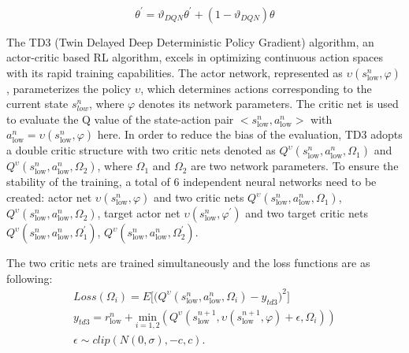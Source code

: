 \documentclass[preprint,12pt]{elsarticle}
\begin{document}
\begin{equation}
\theta^{'}=\vartheta_{DQN}\theta^{'}+(1-\vartheta_{DQN})\theta\label{eq:dqn_para_update}
\end{equation}


The TD3 (Twin Delayed Deep Deterministic Policy Gradient) algorithm, an actor-critic based RL algorithm, excels in optimizing continuous action spaces with its rapid training capabilities. The actor network,
represented as $\upsilon(s_{\textrm{low}}^{n},\varphi)$, parameterizes the policy $\upsilon$, which determines actions corresponding to
the current state $s_{low}^{n}$, where $\varphi$ denotes its network parameters. The critic net is used to evaluate the Q value of the state-action pair $<s_{\textrm{low}}^{n},a_{\textrm{low}}^{n}>$ with $a_{\textrm{low}}^{n}=\upsilon(s_{\textrm{low}}^{n},\varphi)$ here. In order to reduce the bias of the evaluation, TD3 adopts a double critic structure with two critic nets denoted as $Q^{\upsilon}(s_{\textrm{low}}^{n},a_{\textrm{low}}^{n},\Omega_{1})$
and $Q^{\upsilon}(s_{\textrm{low}}^{n},a_{\textrm{low}}^{n},\Omega_{2})$, where $\varOmega_{1}$ and $\varOmega_{2}$ are two network parameters. To ensure the stability of the training, a total of 6 independent neural networks need to be created: actor net $\upsilon(s_{\textrm{low}}^{n},\varphi)$ and two critic nets $Q^{\upsilon}(s_{\textrm{low}}^{n},a_{\textrm{low}}^{n},\Omega_{1})$, $Q^{\upsilon}(s_{\textrm{low}}^{n},a_{\textrm{low}}^{n},\Omega_{2})$, target actor net $\upsilon(s_{\textrm{low}}^{n},\varphi^{'})$ and two target critic nets $Q^{\upsilon}(s_{\textrm{low}}^{n},a_{\textrm{low}}^{n},\Omega_{1}^{'})$, $Q^{\upsilon}(s_{\textrm{low}}^{n},a_{\textrm{low}}^{n},\Omega_{2}^{'})$.

The two critic nets are trained simultaneously and the loss functions are as following:
\begin{equation}
\begin{array}{c}
Loss(\Omega_{i})=E\Biggl[\Biggl(Q^{\upsilon}(s_{\textrm{low}}^{n},a_{\textrm{low}}^{n},\Omega_{i})-y_{td3}\Biggr)^{2}\Biggr]\\
y_{td3}=r_{\textrm{low}}^{n}+\underset{i=1,2}{\textrm{min}}(Q^{\upsilon}(s_{\textrm{low}}^{n+1},\upsilon(s_{\textrm{low}}^{n+1},\varphi)+\epsilon,\Omega_{i}))\\
\epsilon\sim clip(N(0,\sigma),-c,c).
\end{array}
\end{equation}
\end{document}

